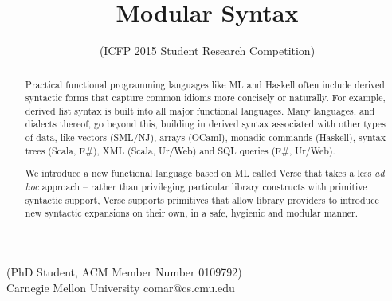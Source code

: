 \documentclass[preprint]{sigplanconf}
\begin{document}
\conferenceinfo{-}{-} 
\copyrightyear{-} 
\copyrightdata{[to be supplied]} 


\title{Modular Syntax}
\subtitle{ (ICFP 2015 Student Research Competition)\vspace{-5px}}

           {(PhD Student, ACM Member Number 0109792)\\
            Carnegie Mellon University}
           {comar@cs.cmu.edu}   

\maketitle
\vspace{-5px}\begin{abstract}
% 

Practical functional programming languages like ML and Haskell often include derived syntactic forms that capture common idioms more concisely or naturally. For example, derived list syntax is built into all major functional languages. Many languages, and dialects thereof, go beyond this, building in derived syntax associated with other types of data, like vectors (SML/NJ), arrays (OCaml), monadic commands (Haskell), syntax trees (Scala, F\#), XML (Scala, Ur/Web) and SQL queries (F\#, Ur/Web).

We introduce a new functional language based on ML called Verse that takes a less \emph{ad hoc} approach -- rather than privileging particular library constructs with primitive syntactic support, Verse supports primitives that allow library providers to introduce new syntactic expansions on their own, in a safe, hygienic and modular manner.\end{abstract}

\vspace{-5px}
\end{document}
